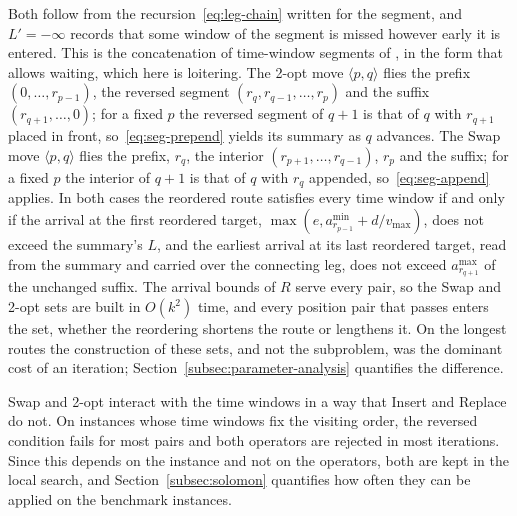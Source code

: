 Both follow from the recursion~\eqref{eq:leg-chain} written for the segment, and $L' = -\infty$ records that some window of the segment is missed however early it is entered. This is the concatenation of time-window segments of \citep{savelsbergh1992vehicle}, in the form that allows waiting, which here is loitering. The 2-opt move $\langle p, q \rangle$ flies the prefix $(0, \ldots, r_{p-1})$, the reversed segment $(r_q, r_{q-1}, \ldots, r_p)$ and the suffix $(r_{q+1}, \ldots, 0)$; for a fixed $p$ the reversed segment of $q + 1$ is that of $q$ with $r_{q+1}$ placed in front, so~\eqref{eq:seg-prepend} yields its summary as $q$ advances. The Swap move $\langle p, q \rangle$ flies the prefix, $r_q$, the interior $(r_{p+1}, \ldots, r_{q-1})$, $r_p$ and the suffix; for a fixed $p$ the interior of $q + 1$ is that of $q$ with $r_q$ appended, so~\eqref{eq:seg-append} applies. In both cases the reordered route satisfies every time window if and only if the arrival at the first reordered target, $\max(e, a^{\min}_{r_{p-1}} + d/v_{\max})$, does not exceed the summary's $L$, and the earliest arrival at its last reordered target, read from the summary and carried over the connecting leg, does not exceed $a^{\max}_{r_{q+1}}$ of the unchanged suffix. The arrival bounds of $R$ serve every pair, so the Swap and 2-opt sets are built in $O(k^2)$ time, and every position pair that passes enters the set, whether the reordering shortens the route or lengthens it. On the longest routes the construction of these sets, and not the subproblem, was the dominant cost of an iteration; Section~\ref{subsec:parameter-analysis} quantifies the difference.

Swap and 2-opt interact with the time windows in a way that Insert and Replace do not. On instances whose time windows fix the visiting order, the reversed condition fails for most pairs and both operators are rejected in most iterations. Since this depends on the instance and not on the operators, both are kept in the local search, and Section~\ref{subsec:solomon} quantifies how often they can be applied on the benchmark instances.

